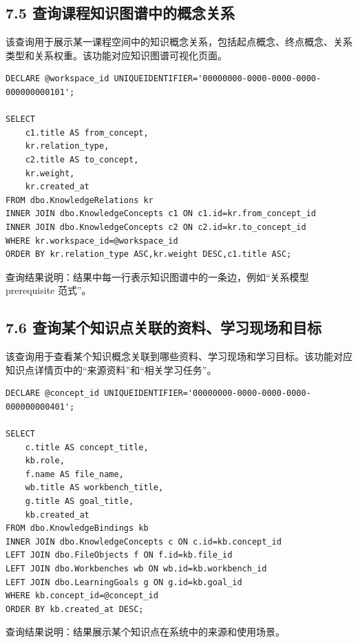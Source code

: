 \documentclass[10pt,a4paper,fontset=none]{ctexart}
\begin{document}
\subsection*{7.5 查询课程知识图谱中的概念关系}

该查询用于展示某一课程空间中的知识概念关系，包括起点概念、终点概念、关系类型和关系权重。该功能对应知识图谱可视化页面。\par

\begin{Verbatim}[fontsize=\scriptsize,frame=single]
DECLARE @workspace_id UNIQUEIDENTIFIER='00000000-0000-0000-0000-000000000101';

SELECT
    c1.title AS from_concept,
    kr.relation_type,
    c2.title AS to_concept,
    kr.weight,
    kr.created_at
FROM dbo.KnowledgeRelations kr
INNER JOIN dbo.KnowledgeConcepts c1 ON c1.id=kr.from_concept_id
INNER JOIN dbo.KnowledgeConcepts c2 ON c2.id=kr.to_concept_id
WHERE kr.workspace_id=@workspace_id
ORDER BY kr.relation_type ASC,kr.weight DESC,c1.title ASC;
\end{Verbatim}

查询结果说明：结果中每一行表示知识图谱中的一条边，例如“关系模型 prerequisite 范式”。\par

\subsection*{7.6 查询某个知识点关联的资料、学习现场和目标}

该查询用于查看某个知识概念关联到哪些资料、学习现场和学习目标。该功能对应知识点详情页中的“来源资料”和“相关学习任务”。\par

\begin{Verbatim}[fontsize=\scriptsize,frame=single]
DECLARE @concept_id UNIQUEIDENTIFIER='00000000-0000-0000-0000-000000000401';

SELECT
    c.title AS concept_title,
    kb.role,
    f.name AS file_name,
    wb.title AS workbench_title,
    g.title AS goal_title,
    kb.created_at
FROM dbo.KnowledgeBindings kb
INNER JOIN dbo.KnowledgeConcepts c ON c.id=kb.concept_id
LEFT JOIN dbo.FileObjects f ON f.id=kb.file_id
LEFT JOIN dbo.Workbenches wb ON wb.id=kb.workbench_id
LEFT JOIN dbo.LearningGoals g ON g.id=kb.goal_id
WHERE kb.concept_id=@concept_id
ORDER BY kb.created_at DESC;
\end{Verbatim}

查询结果说明：结果展示某个知识点在系统中的来源和使用场景。\par
\end{document}
